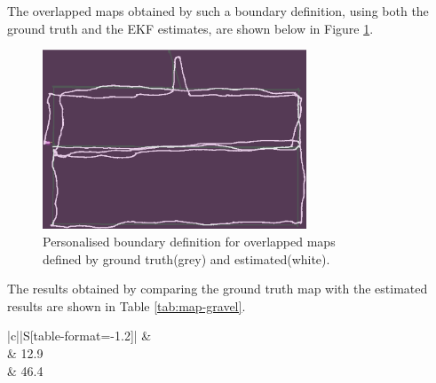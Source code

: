 The overlapped maps obtained by such a boundary definition, using both the ground truth and the \gls{EKF} estimates, are shown below in Figure \ref{fig:occGridBoud}. 
\begin{figure}[!ht]
	\begin{center}
		\includegraphics[width=0.7\textwidth]{Images/5-Results/Gravel5.png}
	\end{center}
	\caption{Personalised boundary definition for overlapped maps\\defined by ground truth(grey) and estimated(white).\centering}
	\label{fig:occGridBoud}
\end{figure}

The results obtained by comparing the ground truth map with the estimated results are shown in Table \ref{tab:map-gravel}.\begin{table}[!ht]
	\small
	\begin{center}
		\begin{tabular}{|c||S[table-format=-1.2]|}
			\hline
			 & \\
			\hline
			\hline
			 & 12.9    \\
			\hline
			 & 46.4  \\
			\hline
		\end{tabular}
		\caption{Gravel Mapping Results\label{tab:map-gravel}}
	\end{center}
\end{table}

